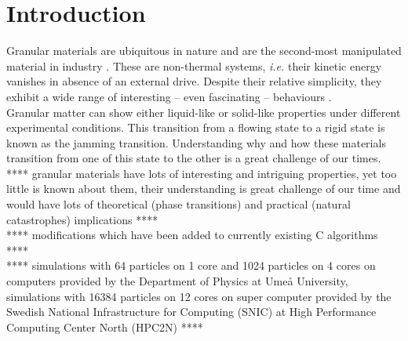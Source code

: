 \documentclass[class=report, float=false, crop=false]{standalone}
\begin{document}
\chapter*{Introduction}
\label{introduction}

Granular materials are ubiquitous in nature and are the second-most manipulated material in industry \cite{patrick2005slow}. These are non-thermal systems, \textit{i.e.} their kinetic energy vanishes in absence of an external drive. Despite their relative simplicity, they exhibit a wide range of interesting -- even fascinating -- behaviours \cite{youtube4}.\\

Granular matter can show either liquid-like or solid-like properties under different experimental conditions. This transition from a flowing state to a rigid state is known as the jamming transition. Understanding why and how these materials transition from one of this state to the other is a great challenge of our times.\\

**** granular materials have lots of interesting and intriguing properties, yet too little is known about them, their understanding is great challenge of our time and would have lots of theoretical (phase transitions) and practical (natural catastrophes) implications \cite{youtube4} ****\\

**** modifications which have been added to currently existing C algorithms ****\\

**** simulations with 64 particles on 1 core and 1024 particles on 4 cores on computers provided by the Department of Physics at Umeå University, simulations with 16384 particles on 12 cores on super computer provided by the Swedish National Infrastructure for Computing (SNIC) at High Performance Computing Center North (HPC2N) ****

% 
\end{document}
